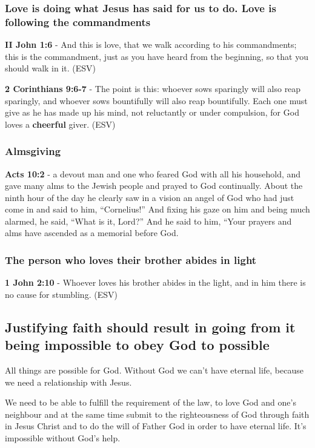 \documentclass[11pt]{article}
\begin{document}
\subsubsection{Love is doing what Jesus has said for us to do. Love is following the commandments}
\label{sec:org5de79ef}
\textbf{II John 1:6} - And this is love, that we walk according to his commandments; this is the commandment, just as you have heard from the beginning, so that you should walk in it. (ESV)

\textbf{2 Corinthians 9:6-7} - The point is this: whoever sows sparingly will also reap sparingly, and whoever sows bountifully will also reap bountifully.  Each one must give as he has made up his mind, not reluctantly or under compulsion, for God loves a \textbf{cheerful} giver.  (ESV)

\subsubsection{Almsgiving}
\label{sec:org2a7424b}
\textbf{Acts 10:2} - a devout man and one who feared God with all his household, and gave many alms to the Jewish people and prayed to God continually.  About the ninth hour of the day he clearly saw in a vision an angel of God who had just come in and said to him, “Cornelius!” And fixing his gaze on him and being much alarmed, he said, “What is it, Lord?” And he said to him, “Your prayers and alms have ascended as a memorial before God.

\subsubsection{The person who loves their brother abides in light}
\label{sec:org296af7f}
\textbf{1 John 2:10} - Whoever loves his brother abides in the light, and in him there is no cause for stumbling.  (ESV)

\subsection{Justifying faith should result in going from it being impossible to obey God to possible}
\label{sec:org40f3f4e}
All things are possible for God.
Without God we can't have eternal life, because we need a relationship with Jesus.

We need to be able to fulfill the requirement
of the law, to love God and one's neighbour and at the same time
submit to the righteousness of God through faith in Jesus
Christ and to do the will of Father God in
order to have eternal life. It's impossible without God's help.
\end{document}
